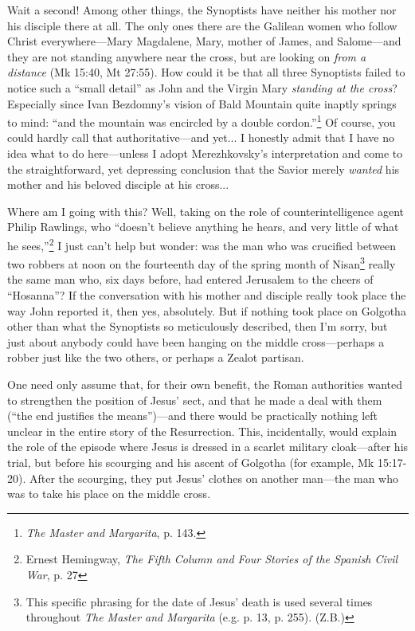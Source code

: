 Wait a second! Among other things, the Synoptists have neither his mother nor his disciple there at all. The only ones there are the Galilean women who follow Christ everywhere---Mary Magdalene, Mary, mother of James, and Salome---and they are not standing anywhere near the cross, but are looking on \emph{from a distance} (Mk 15:40, Mt 27:55). How could it be that all three Synoptists failed to notice such a ``small detail'' as John and the Virgin Mary \emph{standing at the cross}? Especially since Ivan Bezdomny's vision of Bald Mountain quite inaptly springs to mind: ``and the mountain was encircled by a double cordon.''\footnote{\emph{The Master and Margarita}, p. 143.} Of course, you could hardly call that authoritative---and yet... I honestly admit that I have no idea what to do here---unless I adopt Merezhkovsky's interpretation and come to the straightforward, yet depressing conclusion that the Savior merely \emph{wanted} his mother and his beloved disciple at his cross...

Where am I going with this? Well, taking on the role of counterintelligence agent Philip Rawlings, who ``doesn't believe anything he hears, and very little of what he sees,''\footnote{Ernest Hemingway, \emph{The Fifth Column and Four Stories of the Spanish Civil War}, p. 27} I just can't help but wonder: was the man who was crucified between two robbers at noon on the fourteenth day of the spring month of Nisan\footnote{This specific phrasing for the date of Jesus' death is used several times throughout \emph{The Master and Margarita} (e.g. p. 13, p. 255). (Z.B.)} really the same man who, six days before, had entered Jerusalem to the cheers of ``Hosanna''? If the conversation with his mother and disciple really took place the way John reported it, then yes, absolutely. But if nothing took place on Golgotha other than what the Synoptists so meticulously described, then I'm sorry, but just about anybody could have been hanging on the middle cross---perhaps a robber just like the two others, or perhaps a Zealot partisan.

One need only assume that, for their own benefit, the Roman authorities wanted to strengthen the position of Jesus' sect, and that he made a deal with them (``the end justifies the means'')---and there would be practically nothing left unclear in the entire story of the Resurrection. This, incidentally, would explain the role of the episode where Jesus is dressed in a scarlet military cloak---after his trial, but before his scourging and his ascent of Golgotha (for example, Mk 15:17-20). After the scourging, they put Jesus' clothes on another man---the man who was to take his place on the middle cross.

